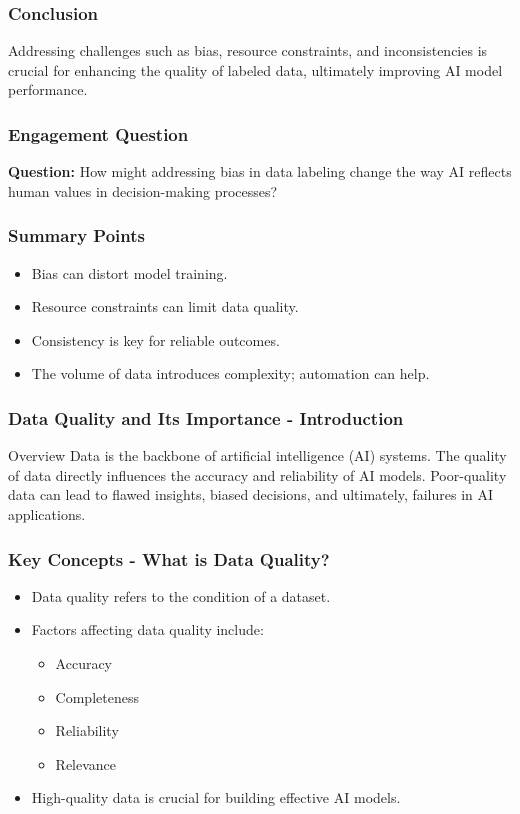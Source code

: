 \documentclass[aspectratio=169]{beamer}
\begin{document}
\begin{frame}[fragile]
    \frametitle{Conclusion}
    
    Addressing challenges such as bias, resource constraints, and inconsistencies is crucial for enhancing the quality of labeled data, ultimately improving AI model performance.
\end{frame}

\begin{frame}[fragile]
    \frametitle{Engagement Question}
    
    \textbf{Question:} How might addressing bias in data labeling change the way AI reflects human values in decision-making processes?
\end{frame}

\begin{frame}[fragile]
    \frametitle{Summary Points}
    
    \begin{itemize}
        \item Bias can distort model training.
        \item Resource constraints can limit data quality.
        \item Consistency is key for reliable outcomes.
        \item The volume of data introduces complexity; automation can help.
    \end{itemize}
\end{frame}

\begin{frame}[fragile]
    \frametitle{Data Quality and Its Importance - Introduction}
    \begin{block}{Overview}
        Data is the backbone of artificial intelligence (AI) systems. The quality of data directly influences the accuracy and reliability of AI models. Poor-quality data can lead to flawed insights, biased decisions, and ultimately, failures in AI applications.
    \end{block}
\end{frame}

\begin{frame}[fragile]
    \frametitle{Key Concepts - What is Data Quality?}
    \begin{itemize}
        \item Data quality refers to the condition of a dataset.
        \item Factors affecting data quality include:
        \begin{itemize}
            \item Accuracy
            \item Completeness
            \item Reliability
            \item Relevance
        \end{itemize}
        \item High-quality data is crucial for building effective AI models.
    \end{itemize}
\end{frame}
\end{document}
